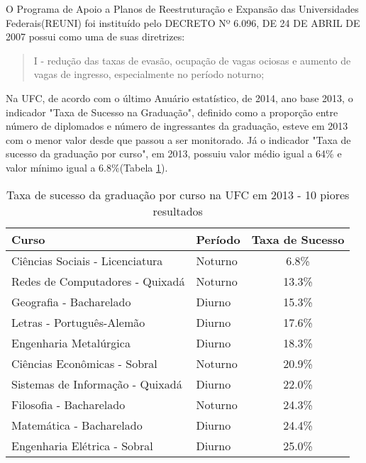 O Programa de Apoio a Planos de Reestruturação e Expansão das Universidades Federais(REUNI) foi instituído pelo DECRETO Nº 6.096, DE 24 DE ABRIL DE 2007  possui como uma de suas diretrizes:

\begin{quote}
I - redução das taxas de evasão, ocupação de vagas ociosas e aumento de vagas de ingresso, especialmente no período noturno;
\end{quote}

Na UFC, de acordo com o último Anuário estatístico, de 2014, ano base 2013, o indicador "Taxa de Sucesso na Graduação", definido como a proporção entre número de diplomados e número de ingressantes da graduação, esteve em 2013 com o menor valor desde que passou a ser monitorado. Já o indicador "Taxa de sucesso da graduação por curso", em 2013, possuiu valor médio igual a 64\% e valor mínimo igual a 6.8\%(Tabela \ref{table:ts_2013}).

\begin{table}
\begin{tabular}{llc}
\toprule
                            Curso &  Período & Taxa de Sucesso \\
\midrule
  Ciências Sociais - Licenciatura &  Noturno &            6.8\% \\
  Redes de Computadores - Quixadá &  Noturno &           13.3\% \\
          Geografia - Bacharelado &   Diurno &           15.3\% \\
        Letras - Português-Alemão &   Diurno &           17.6\% \\
           Engenharia Metalúrgica &   Diurno &           18.3\% \\
     Ciências Econômicas - Sobral &  Noturno &           20.9\% \\
 Sistemas de Informação - Quixadá &   Diurno &           22.0\% \\
          Filosofia - Bacharelado &  Noturno &           24.3\% \\
         Matemática - Bacharelado &   Diurno &           24.4\% \\
     Engenharia Elétrica - Sobral &   Diurno &           25.0\% \\
\bottomrule
\end{tabular}
\caption{Taxa de sucesso da graduação por curso na UFC em 2013 - 10 piores resultados}
\label{table:ts_2013}
\end{table}


